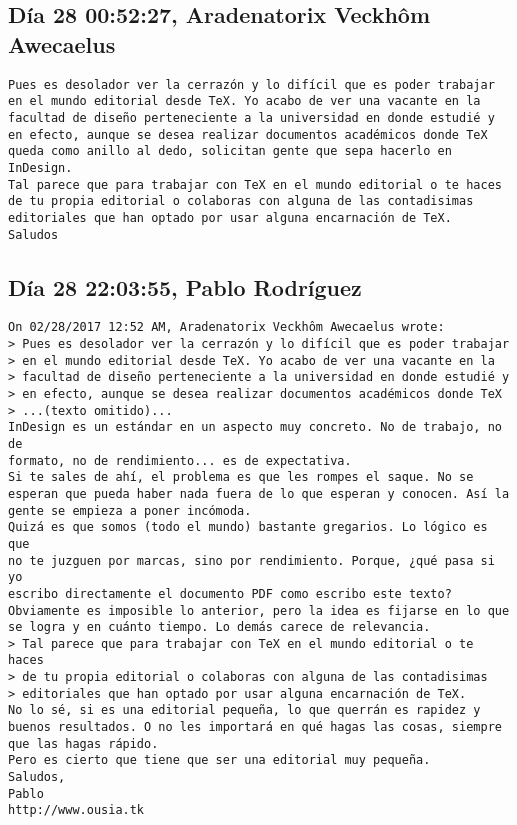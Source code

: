 \documentclass[a4paper,10pt]{article}
\begin{document}
\subsection{Día 28 00:52:27, Aradenatorix Veckhôm Awecaelus}

\begin{lstlisting}
Pues es desolador ver la cerrazón y lo difícil que es poder trabajar
en el mundo editorial desde TeX. Yo acabo de ver una vacante en la
facultad de diseño perteneciente a la universidad en donde estudié y
en efecto, aunque se desea realizar documentos académicos donde TeX
queda como anillo al dedo, solicitan gente que sepa hacerlo en
InDesign.
Tal parece que para trabajar con TeX en el mundo editorial o te haces
de tu propia editorial o colaboras con alguna de las contadisimas
editoriales que han optado por usar alguna encarnación de TeX.
Saludos

\end{lstlisting}

\subsection{Día 28 22:03:55, Pablo Rodríguez}

\begin{lstlisting}
On 02/28/2017 12:52 AM, Aradenatorix Veckhôm Awecaelus wrote:
> Pues es desolador ver la cerrazón y lo difícil que es poder trabajar
> en el mundo editorial desde TeX. Yo acabo de ver una vacante en la
> facultad de diseño perteneciente a la universidad en donde estudié y
> en efecto, aunque se desea realizar documentos académicos donde TeX
> ...(texto omitido)...
InDesign es un estándar en un aspecto muy concreto. No de trabajo, no de
formato, no de rendimiento... es de expectativa.
Si te sales de ahí, el problema es que les rompes el saque. No se
esperan que pueda haber nada fuera de lo que esperan y conocen. Así la
gente se empieza a poner incómoda.
Quizá es que somos (todo el mundo) bastante gregarios. Lo lógico es que
no te juzguen por marcas, sino por rendimiento. Porque, ¿qué pasa si yo
escribo directamente el documento PDF como escribo este texto?
Obviamente es imposible lo anterior, pero la idea es fijarse en lo que
se logra y en cuánto tiempo. Lo demás carece de relevancia.
> Tal parece que para trabajar con TeX en el mundo editorial o te haces
> de tu propia editorial o colaboras con alguna de las contadisimas
> editoriales que han optado por usar alguna encarnación de TeX.
No lo sé, si es una editorial pequeña, lo que querrán es rapidez y
buenos resultados. O no les importará en qué hagas las cosas, siempre
que las hagas rápido.
Pero es cierto que tiene que ser una editorial muy pequeña.
Saludos,
Pablo
http://www.ousia.tk

\end{lstlisting}
\end{document}
